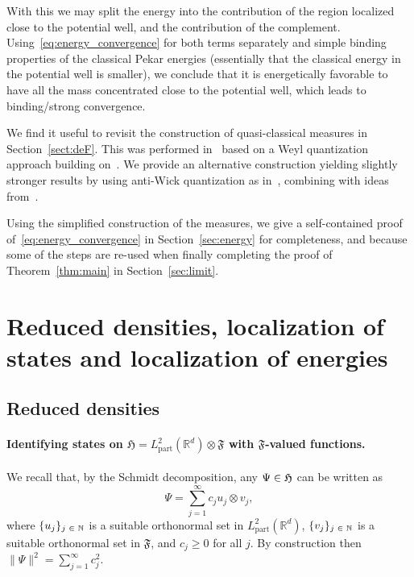 \documentclass[AHL,Unicode,longabstracts,published]{cedram}
\DeclareMathOperator{\partt}{part}
\newcommand{\bN}{\mathbb{N}}
\newcommand{\R}{\mathbb{R}}
\newcommand{\gH}{\mathfrak{H}}
\newcommand{\gF}{\mathfrak{F}}
\newcommand{\1}{\mathds{1}}
\let\oldin\in
\renewcommand{\in}{\mathchoice{\oldin}{\oldin}{\,\oldin\,}{\,\oldin\,}}
\newcounter{setofstep}
\newcounter{step}[setofstep]
\begin{document}
With this we may split the energy into the contribution of the region localized close to the potential well, and the contribution of the complement. Using~\eqref{eq:energy_convergence} for both terms separately and simple binding properties of the classical Pekar energies (essentially that the classical energy in the potential well is smaller), we conclude that it is energetically favorable to have all the mass concentrated close to the potential well, which leads to binding/strong convergence.

We find it useful to revisit the construction of quasi-classical measures in Section~\ref{sect:deF}. This was performed in~\cite{CorFal-18,CorFalOli-19b,CorFalOli-20,CorFalOli-19} based on a Weyl quantization approach building on~\cite{AmmNie-08,AmmNie-09}. We provide an alternative construction yielding slightly stronger results by using anti-Wick quantization as in~\cite{LewNamRou-14,LewNamRou-14d}, combining with ideas from~\cite{FanLewVer-88}.

Using the simplified construction of the measures, we give a self-contained proof of~\eqref{eq:energy_convergence} in Section~\ref{sec:energy} for completeness, and because some of the steps are re-used when finally completing the proof of Theorem~\ref{thm:main} in Section~\ref{sec:limit}.


\section{Reduced densities, localization of states and localization of energies} \label{sect:loc}

\subsection{Reduced densities}\label{sec:DMs}


\paragraph{Identifying states on $ \gH=L^2_{\partt}(\R^d)\otimes\gF$ with $\gF$-valued functions.}
We recall that, by the Schmidt decomposition, any $\Psi\in  \gH$ can be written as
\begin{equation}\label{eq:schmidt}
\Psi= \sum_{j=1}^\infty c_j u_j\otimes v_j,
\end{equation}
where $\{u_j\}_{j\in\bN}$ is a suitable orthonormal set in $L^2_{\partt}(\R^d)$, $\{v_j\}_{j\in\bN}$ is a suitable orthonormal set in $\gF$, and $c_j\ge0$ for all $j$. By construction then $\|\Psi\|^2=\sum_{j=1}^\infty c_j^2$.
\end{document}
